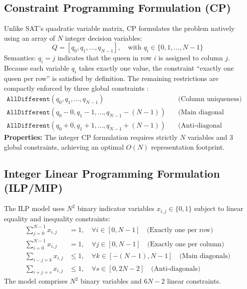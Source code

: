 \documentclass[a4paper,11pt]{article}
\begin{document}
\subsection{Constraint Programming Formulation (CP)}
Unlike SAT's quadratic variable matrix, CP formulates the problem natively using an array of $N$ integer decision variables:
\begin{equation}
    Q = [q_0, q_1, \dots, q_{N-1}], \quad \text{with } q_i \in \{0, 1, \dots, N-1\}
\end{equation}
Semantics: $q_i = j$ indicates that the queen in row $i$ is assigned to column $j$.
Because each variable $q_i$ takes exactly one value, the constraint ``exactly one queen per row'' is satisfied by definition. The remaining restrictions are compactly enforced by three global constraints \cite{regin1994}:
\begin{align}
    \texttt{AllDifferent}(q_0, q_1, \dots, q_{N-1}) & \quad \text{(Column uniqueness)} \\
    \texttt{AllDifferent}(q_0 - 0, q_1 - 1, \dots, q_{N-1} - (N-1)) & \quad \text{(Main diagonal uniqueness)} \\
    \texttt{AllDifferent}(q_0 + 0, q_1 + 1, \dots, q_{N-1} + (N-1)) & \quad \text{(Anti-diagonal uniqueness)}
\end{align}
\textbf{Properties:} The integer CP formulation requires strictly $N$ variables and 3 global constraints, achieving an optimal $O(N)$ representation footprint.

\subsection{Integer Linear Programming Formulation (ILP/MIP)}
The ILP model uses $N^2$ binary indicator variables $x_{i,j} \in \{0, 1\}$ subject to linear equality and inequality constraints:
\begin{align}
    \sum_{j=0}^{N-1} x_{i,j} &= 1, \quad \forall i \in [0, N-1] \quad \text{(Exactly one per row)} \\
    \sum_{i=0}^{N-1} x_{i,j} &= 1, \quad \forall j \in [0, N-1] \quad \text{(Exactly one per column)} \\
    \sum_{i-j=k} x_{i,j} &\le 1, \quad \forall k \in [-(N-1), N-1] \quad \text{(Main diagonals)} \\
    \sum_{i+j=s} x_{i,j} &\le 1, \quad \forall s \in [0, 2N-2] \quad \text{(Anti-diagonals)}
\end{align}
The model comprises $N^2$ binary variables and $6N - 2$ linear constraints.
\end{document}
